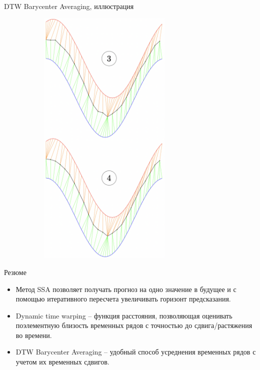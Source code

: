 \begin{frame}{DTW Barycenter Averaging, иллюстрация}
\begin{figure}[H]
\begin{subfigure}[t]{0.45\textwidth}
         \includegraphics[width=0.7\textwidth]{lecture_7/figs/DBA_3_4.png}
     \end{subfigure}
\end{figure}    
\end{frame}
\begin{frame}{Резюме}
\begin{itemize}
    \item Метод SSA позволяет получать прогноз на одно значение в будущее и с помощью итеративного пересчета увеличивать горизонт предсказания. 
    \item Dynamic time warping -- функция расстояния, позволяющая оценивать поэлементную близость временных рядов с точностью до сдвига/растяжения во времени.
    \item DTW Barycenter Averaging -- удобный способ усреднения временных рядов с учетом их временных сдвигов.
\end{itemize}
\end{frame}
 